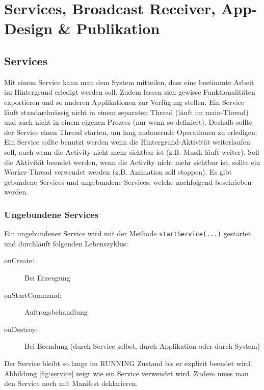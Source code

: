 \chapter{Services, Broadcast Receiver, App- Design \& Publikation}

\section{Services}

Mit einem Service kann man dem System mitteilen, dass eine bestimmte Arbeit im Hintergrund erledigt werden soll. Zudem lassen sich gewisse Funktionalitäten exportieren und so anderen Applikationen zur Verfügung stellen. Ein Service läuft standardmässig nicht in einem separaten Thread (läuft im main-Thread) und auch nicht in einem eigenen Prozess (nur wenn so definiert). Deshalb sollte der Service einen Thread starten, um lang andauernde Operationen zu erledigen. Ein Service sollte benutzt werden wenn die Hintergrund-Aktivität weiterlaufen soll, auch wenn die Activity nicht mehr sichtbar ist (z.B. Musik läuft weiter). Soll die Aktivität beendet werden, wenn die Activity nicht mehr sichtbar ist, sollte ein Worker-Thread verwendet werden (z.B. Animation soll stoppen). Es gibt gebundene Services und ungebundene Services, welche nachfolgend beschrieben werden.

\subsection{Ungebundene Services}

Ein ungebundener Service wird mit der Methode \texttt{startService(...)} gestartet und durchläuft folgenden Lebenszyklus:
\begin{description}
	\item[onCreate:] Bei Erzeugung
	\item[onStartCommand:] Auftragsbehandlung
	\item[onDestroy:] Bei Beendung (durch Service selbst, durch Applikation oder durch System)
\end{description}
Der Service bleibt so lange im RUNNING Zustand bis er explizit beendet wird. Abbildung \ref{fig:service} zeigt wie ein Service verwendet wird. Zudem muss man den Service noch mit Manifest deklarieren. 

